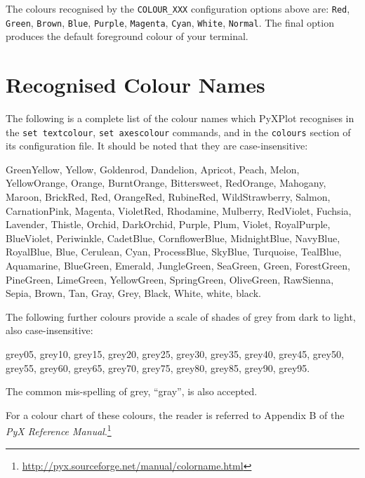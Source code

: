 The colours recognised by the \texttt{COLOUR\_XXX} configuration options above are: \texttt{Red}, \texttt{Green}, \texttt{Brown}, \texttt{Blue}, \texttt{Purple}, \texttt{Magenta}, \texttt{Cyan}, \texttt{White}, \texttt{Normal}. The final option produces the default foreground colour of your terminal.

\section{Recognised Colour Names}
\label{colour_names}

The following is a complete list of the colour names which PyXPlot recognises in the \texttt{set textcolour}, \texttt{set axescolour} commands, and in the \texttt{colours} section of its configuration file. It should be noted that they are case-insensitive:

GreenYellow, Yellow, Goldenrod, Dandelion, Apricot, Peach, Melon, YellowOrange, Orange, BurntOrange, Bittersweet, RedOrange, Mahogany, Maroon, BrickRed, Red, OrangeRed, RubineRed, WildStrawberry, Salmon, CarnationPink, Magenta, VioletRed, Rhodamine, Mulberry, RedViolet, Fuchsia, Lavender, Thistle, Orchid, DarkOrchid, Purple, Plum, Violet, RoyalPurple, BlueViolet, Periwinkle, CadetBlue, CornflowerBlue, MidnightBlue, NavyBlue, RoyalBlue, Blue, Cerulean, Cyan, ProcessBlue, SkyBlue, Turquoise, TealBlue, Aquamarine, BlueGreen, Emerald, JungleGreen, SeaGreen, Green, ForestGreen, PineGreen, LimeGreen, YellowGreen, SpringGreen, OliveGreen, RawSienna, Sepia, Brown, Tan, Gray, Grey, Black, White, white, black.

The following further colours provide a scale of shades of grey from dark to light, also case-insensitive:

grey05, grey10, grey15, grey20, grey25, grey30, grey35, grey40, grey45, grey50, grey55, grey60, grey65, grey70, grey75, grey80, grey85, grey90, grey95.

The common mis-spelling of grey, ``gray'', is also accepted.

For a colour chart of these colours, the reader is referred to Appendix B of the \textit{PyX Reference Manual}.\footnote{\url{http://pyx.sourceforge.net/manual/colorname.html}}

